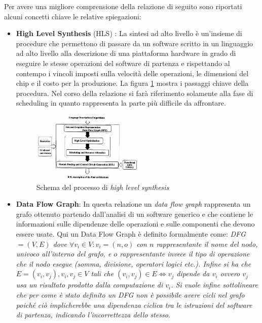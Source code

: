 \documentclass[]{IEEEtran}
\begin{document}
Per avere una migliore comprensione della relazione di seguito sono riportati alcuni concetti chiave le relative spiegazioni:
\begin{itemize}
	\item \textbf{High Level Synthesis} (HLS) \cite{HLS}: La sintesi ad alto livello è un'insieme di procedure che permettono di passare da un software scritto in un linguaggio ad alto livello alla descrizione di una piattaforma hardware in grado di eseguire le stesse operazioni del software di partenza e rispettando al contempo i vincoli imposti sulla velocità delle operazioni, le dimensioni del chip e il costo per la produzione. La figura \ref{hls} mostra i passaggi chiave della procedura. Nel corso della relazione si farà riferimento solamente alla fase di scheduling in quanto rappresenta la parte più difficile da affrontare.
	\begin{figure}[htp]
		\centering
		\includegraphics[width=0.5\textwidth]{images/Hls_flow.png}
		\caption{Schema del processo di \emph{high level synthesis}}
		\label{hls}
	\end{figure}
	
	\item \textbf{Data Flow Graph}: In questa relazione un \emph{data flow graph }rappresenta un grafo ottenuto partendo dall'analisi di un software generico e che contiene le informazioni sulle dipendenze delle operazioni e sulle componenti che devono essere usate. Qui un Data Flow Graph è definito formalmente come:
	\it{DFG} \normalfont $=(V,E)$ dove $\forall v_i\in V : v_i = (n,o)$ con $n$ rappresentante il nome del nodo, \emph{univoco} all'interno del grafo, e $o$ rappresentante invece il tipo di operazione che il nodo esegue (somma, divisione, operatori logici etc.). Infine si ha che $E = {(v_i,v_j)}, v_i,v_j \in V$ tali che $(v_i,v_j) \in E \iff v_j$ dipende da $v_i$ ovvero $v_j$ usa un risultato prodotto dalla computazione di $v_i$. Si vuole infine sottolineare che per come è stato definito un DFG non è possibile avere cicli nel grafo poiché ciò implicherebbe una dipendenza ciclica tra le istruzioni del software di partenza, indicando l'incorrettezza dello stesso.
	

\end{itemize}
\end{document}
